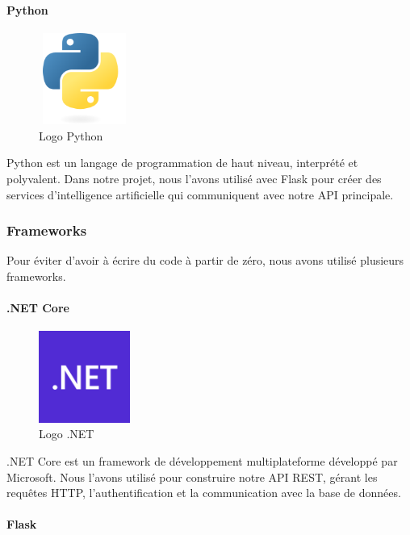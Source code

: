 \paragraph{Python}

\begin{figure}[H]
    \centering
    \includegraphics[width=3cm, height=3cm]{images/python.png}
    \caption{Logo Python}
\end{figure}

\noindent Python \cite{python} est un langage de programmation de haut niveau, interprété et polyvalent. Dans notre projet, nous l'avons utilisé avec Flask \cite{flask} pour créer des services d'intelligence artificielle qui communiquent avec notre API principale.

\subsubsection{Frameworks}

\noindent Pour éviter d'avoir à écrire du code à partir de zéro, nous avons utilisé plusieurs frameworks.

\paragraph{.NET Core}

\begin{figure}[H]
    \centering
    \includegraphics[width=3cm, height=3cm]{images/net.png}
    \caption{Logo .NET}
\end{figure}

\noindent .NET Core est un framework de développement multiplateforme développé par Microsoft. Nous l'avons utilisé pour construire notre API REST, gérant les requêtes HTTP, l'authentification et la communication avec la base de données.

\paragraph{Flask}

